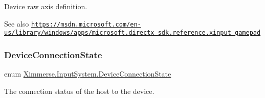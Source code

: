 Device raw axis definition. 

\begin{DoxySeeAlso}{See also}
\href{https://msdn.microsoft.com/en-us/library/windows/apps/microsoft.directx_sdk.reference.xinput_gamepad}{\tt https\+://msdn.\+microsoft.\+com/en-\/us/library/windows/apps/microsoft.\+directx\+\_\+sdk.\+reference.\+xinput\+\_\+gamepad} 
\end{DoxySeeAlso}
\mbox{\label{namespace_ximmerse_1_1_input_system_ae83a958497a9f53a5b605720a5bddfb6}} 
\subsubsection{\texorpdfstring{Device\+Connection\+State}{DeviceConnectionState}}
{\footnotesize\ttfamily enum \mbox{\hyperlink{namespace_ximmerse_1_1_input_system_ae83a958497a9f53a5b605720a5bddfb6}{Ximmerse.\+Input\+System.\+Device\+Connection\+State}}\hspace{0.3cm}{\ttfamily [strong]}}



The connection status of the host to the device. 

